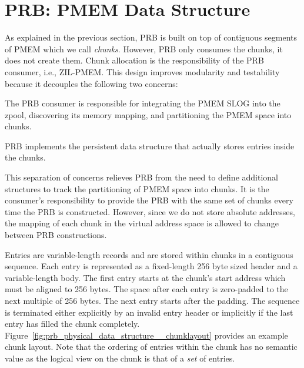 \documentclass[12pt,a4paper,twoside]{book}
\begin{document}
{\section{PRB: PMEM Data Structure}\label{di:prb:pmemdatastructure}
As explained in the previous section, PRB is built on top of contiguous segments of PMEM which we call \textit{chunks}.
However, PRB only consumes the chunks, it does not create them.
Chunk allocation is the responsibility of the PRB consumer, i.e., ZIL-PMEM.
This design improves modularity and testability because it decouples the following two concerns:
\begin{description}[noitemsep,leftmargin=1.5cm,labelindent=1cm]
    \item[Resource Acquisition] The PRB consumer is responsible for integrating the PMEM SLOG into the zpool, discovering its memory mapping, and partitioning the PMEM space into chunks.
    \item[PMEM Data Structure] PRB implements the persistent data structure that actually stores entries inside the chunks.
\end{description}
This separation of concerns relieves PRB from the need to define additional structures to track the partitioning of PMEM space into chunks.
It is the consumer's responsibility to provide the PRB with the same set of chunks every time the PRB is constructed.
However, since we do not store absolute addresses, the mapping of each chunk in the virtual address space is allowed to change between PRB constructions.

Entries are variable-length records and are stored within chunks in a contiguous sequence.
Each entry is represented as a fixed-length 256 byte sized header and a variable-length body.
The first entry starts at the chunk's start address which must be aligned to 256 bytes.
The space after each entry is zero-padded to the next multiple of 256 bytes.
The next entry starts after the padding.
The sequence is terminated either explicitly by an invalid entry header or implicitly if the last entry has filled the chunk completely.
Figure~\ref{fig:prb_physical_data_structure__chunklayout} provides an example chunk layout.
Note that the ordering of entries within the chunk has no semantic value as the logical view on the chunk is that of a \textit{set} of entries.

}
\end{document}

